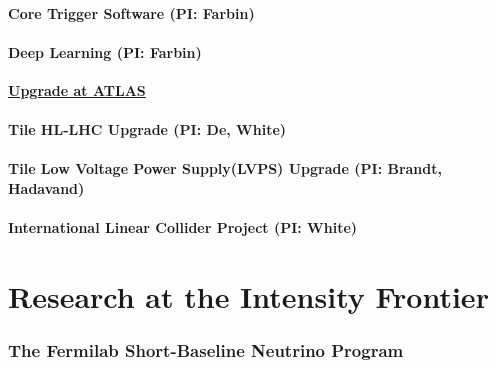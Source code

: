 \documentclass[11pt]{article}
\def\overhead#1{\part{#1}}
\def\onehead#1{\section{#1}}
\def\twohead#1{\subsection{#1}}
\begin{document}

\twohead{Core Trigger Software (PI: Farbin)}

\twohead{Deep Learning (PI: Farbin)}


\begin{center}
\underline{\textbf{\huge Upgrade at ATLAS}}
\end{center}

\twohead{Tile HL-LHC Upgrade (PI: De, White)}

\twohead{Tile Low Voltage Power Supply(LVPS) Upgrade  (PI: Brandt, Hadavand)}
\label{sec:Tile-HL-LHC}



\twohead{International Linear Collider Project (PI: White)}









\newpage


\overhead{Research at the Intensity Frontier}



%

\newpage


\onehead{The Fermilab Short-Baseline Neutrino Program}

\end{document}
